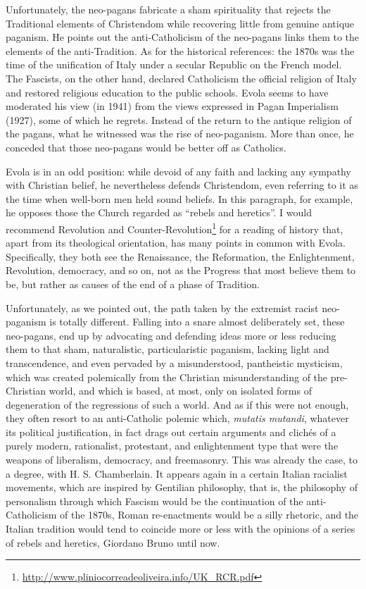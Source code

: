 \begin{quotationx}
Unfortunately, the neo-pagans fabricate a sham spirituality that rejects the Traditional elements of Christendom while recovering little from genuine antique paganism. He points out the anti-Catholicism of the neo-pagans links them to the elements of the anti-Tradition. As for the historical references: the 1870s was the time of the unification of Italy under a secular Republic on the French model. The Fascists, on the other hand, declared Catholicism the official religion of Italy and restored religious education to the public schools. Evola seems to have moderated his view (in 1941) from the views expressed in Pagan Imperialism (1927), some of which he regrets. Instead of the return to the antique religion of the pagans, what he witnessed was the rise of neo-paganism. More than once, he conceded that those neo-pagans would be better off as Catholics.

Evola is in an odd position: while devoid of any faith and lacking any sympathy with Christian belief, he nevertheless defends Christendom, even referring to it as the time when well-born men held sound beliefs. In this paragraph, for example, he opposes those the Church regarded as ``rebels and heretics''. I would recommend Revolution and Counter-Revolution\footnote{\url{http://www.pliniocorreadeoliveira.info/UK\_RCR.pdf}} for a reading of history that, apart from its theological orientation, has many points in common with Evola. Specifically, they both see the Renaissance, the Reformation, the Enlightenment, Revolution, democracy, and so on, not as the Progress that most believe them to be, but rather as causes of the end of a phase of Tradition.
\end{quotationx}

Unfortunately, as we pointed out, the path taken by the extremist racist neo-paganism is totally different. Falling into a snare almost deliberately set, these neo-pagans, end up by advocating and defending ideas more or less reducing them to that sham, naturalistic, particularistic paganism, lacking light and transcendence, and even pervaded by a misunderstood, pantheistic mysticism, which was created polemically from the Christian misunderstanding of the pre-Christian world, and which is based, at most, only on isolated forms of degeneration of the regressions of such a world. And as if this were not enough, they often resort to an anti-Catholic polemic which, \emph{mutatis mutandi}, whatever its political justification, in fact drags out certain arguments and clichés of a purely modern, rationalist, protestant, and enlightenment type that were the weapons of liberalism, democracy, and freemasonry. This was already the case, to a degree, with H. S. Chamberlain. It appears again in a certain Italian racialist movements, which are inspired by Gentilian philosophy, that is, the philosophy of personalism through which Fascism would be the continuation of the anti-Catholicism of the 1870s, Roman re-enactments would be a silly rhetoric, and the Italian tradition would tend to coincide more or less with the opinions of a series of rebels and heretics, Giordano Bruno until now.

